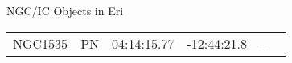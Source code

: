 \begin{block}{NGC/IC Objects in Eri}
  \centering
  \begin{tabularx}{\textwidth}{llrrll} \toprule 
    NGC1535 & PN & 04:14:15.77 & -12:44:21.8  & -- \\ 
  \end{tabularx}
\end{block}